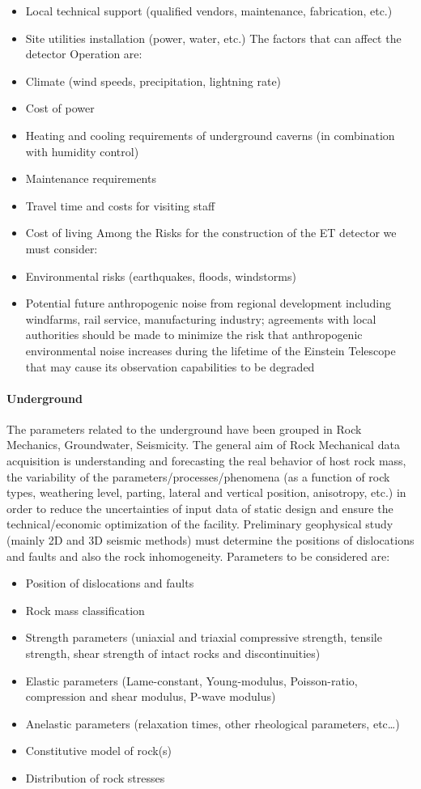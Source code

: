 \begin{itemize}
\item	Local technical support (qualified vendors, maintenance, fabrication, etc.)
\item	Site utilities installation (power, water, etc.)
The factors that can affect the detector Operation are:
\item	Climate (wind speeds, precipitation, lightning rate)
\item	Cost of power
\item	Heating and cooling requirements of underground caverns (in combination with humidity control)
\item	Maintenance requirements
\item	Travel time and costs for visiting staff
\item	Cost of living
Among the Risks for the construction of the ET detector we must consider:
\item	Environmental risks (earthquakes, floods, windstorms) 
\item	Potential future anthropogenic noise from regional development including windfarms, rail service, manufacturing industry; agreements with local authorities should be made to minimize the risk that anthropogenic environmental noise increases during the lifetime of the Einstein Telescope that may cause its observation capabilities to be degraded
\end{itemize}

\paragraph{Underground}  The parameters related to the underground have been grouped in Rock Mechanics, Groundwater, Seismicity. The general aim of Rock Mechanical data acquisition is understanding and forecasting the real behavior of host rock mass, the variability of the parameters/processes/phenomena (as a function of rock types, weathering level, parting, lateral and vertical position, anisotropy, etc.) in order to reduce the uncertainties of input data of static design and ensure the technical/economic optimization of the facility. Preliminary geophysical study (mainly 2D and 3D seismic methods) must determine the positions of dislocations and faults and also the rock inhomogeneity. Parameters to be considered are:
\begin{itemize}
\item	Position of dislocations and faults
\item	Rock mass classification
\item	Strength parameters (uniaxial and triaxial compressive strength, tensile strength, shear strength of intact rocks and discontinuities)
\item	Elastic parameters (Lame-constant, Young-modulus, Poisson-ratio, compression and shear modulus, P-wave modulus)
\item	Anelastic parameters (relaxation times, other rheological parameters, etc…)
\item	Constitutive model of rock(s)
\item	Distribution of rock stresses
\end{itemize}

